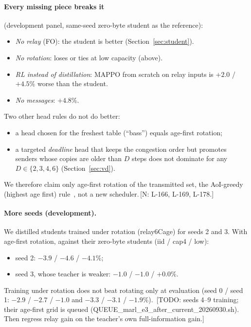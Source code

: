 \documentclass[11pt]{article}
\theoremstyle{definition}
\newif\ifshownotes\shownotestrue
\newcommand{\NOTE}[1]{\ifshownotes{\color{notecol}\,\textsf{\footnotesize[N: #1]}}\fi}
\newcommand{\TODO}[1]{\ifshownotes{\color{todocol}\,\textsf{\footnotesize[TODO: #1]}}\fi}
\begin{document}
\paragraph{Every missing piece breaks it} (development panel, same-seed zero-byte student as the reference):
\begin{itemize}
\item \emph{No relay} (FO): the student is better (Section~\ref{sec:student}).
\item \emph{No rotation}: loses or ties at low capacity (above).
\item \emph{RL instead of distillation}: MAPPO from scratch on relay inputs is $+2.0$ / $+4.5\%$ worse than the student.
\item \emph{No messages}: $+4.8\%$.
\end{itemize}
Two other head rules do not do better:
\begin{itemize}
\item a head chosen for the freshest table (``bass'') equals age-first rotation;
\item a targeted \emph{deadline} head that keeps the congestion order but promotes senders whose copies are older than
$D$ steps does not dominate for any $D\in\{2,3,4,6\}$ (Section~\ref{sec:vd}).
\end{itemize}
We therefore claim only age-first rotation of the transmitted set, the AoI-greedy (highest age first)
rule~\cite{kadota2018}, not a new scheduler.\NOTE{L-166, L-169, L-178.}
\paragraph{More seeds (development).} We distilled students trained under rotation (relay6Cage) for seeds 2 and 3. With
age-first rotation, against their zero-byte students (iid / cap4 / low):
\begin{itemize}
\item seed 2: $-3.9$ / $-4.6$ / $-4.1\%$;
\item seed 3, whose teacher is weaker: $-1.0$ / $-1.0$ / $+0.0\%$.
\end{itemize}
Training under rotation does not beat rotating only at evaluation (seed 0 / seed 1: $-2.9$ / $-2.7$ / $-1.0$ and $-3.3$ /
$-3.1$ / $-1.9\%$). \TODO{seeds 4--9 training; their age-first grid is queued (QUEUE\_marl\_e3\_after\_current\_20260930.sh).
Then regress relay gain on the teacher's own full-information gain.}
\end{document}
